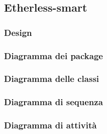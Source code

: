 \subsection{Etherless-smart}
\subsubsection{Design}
\subsubsection{Diagramma dei package}
\subsubsection{Diagramma delle classi}
\subsubsection{Diagramma di sequenza}
\subsubsection{Diagramma di attività}

